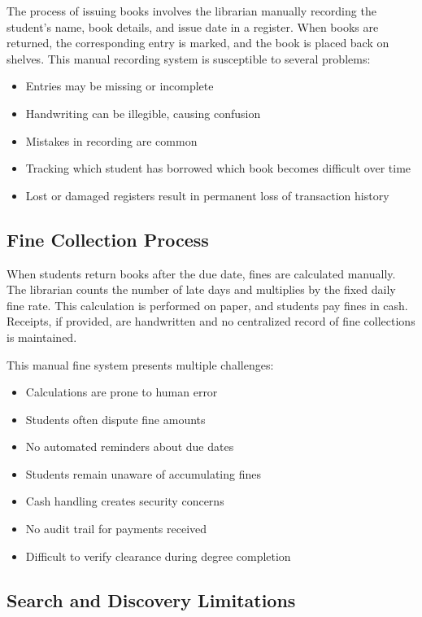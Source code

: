 \documentclass[12pt,a4paper]{report}
\begin{document}
The process of issuing books involves the librarian manually recording the student's name, book details, and issue date in a register. When books are returned, the corresponding entry is marked, and the book is placed back on shelves. This manual recording system is susceptible to several problems:

\begin{itemize}
    \item Entries may be missing or incomplete
    \item Handwriting can be illegible, causing confusion
    \item Mistakes in recording are common
    \item Tracking which student has borrowed which book becomes difficult over time
    \item Lost or damaged registers result in permanent loss of transaction history
\end{itemize}

\subsection{Fine Collection Process}

When students return books after the due date, fines are calculated manually. The librarian counts the number of late days and multiplies by the fixed daily fine rate. This calculation is performed on paper, and students pay fines in cash. Receipts, if provided, are handwritten and no centralized record of fine collections is maintained.

This manual fine system presents multiple challenges:

\begin{itemize}
    \item Calculations are prone to human error
    \item Students often dispute fine amounts
    \item No automated reminders about due dates
    \item Students remain unaware of accumulating fines
    \item Cash handling creates security concerns
    \item No audit trail for payments received
    \item Difficult to verify clearance during degree completion
\end{itemize}


\subsection{Search and Discovery Limitations}
\end{document}
